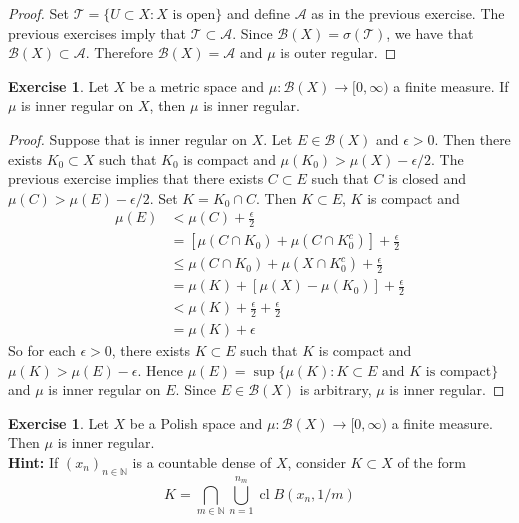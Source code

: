 \documentclass{book}
\theoremstyle{definition}
\newtheorem{ex}[definition]{Exercise}
\newcommand{\ep}{\epsilon}
\newcommand{\sig}{\sigma}
\newcommand{\N}{\mathbb{N}}
\newcommand{\MA}{\mathcal{A}}
\newcommand{\MB}{\mathcal{B}}
\newcommand{\MT}{\mathcal{T}}
\DeclareMathOperator{\cl}{cl}
\DeclareMathOperator*{\0}{\mbf{0}}
\DeclareMathOperator*{\1}{\mbf{1}}
\begin{document}
	\begin{proof}
		Set $\MT = \{U \subset X: X \text{ is open}\}$ and define $\MA$ as in the previous exercise. The previous exercises imply that $\MT \subset \MA$. Since $\MB(X) = \sig(\MT)$, we have that $\MB(X) \subset \MA$. Therefore $\MB(X) = \MA$ and $\mu$ is outer regular.  
	\end{proof}

	\begin{ex}
		Let $X$ be a metric space and $\mu: \MB(X) \rightarrow [0, \infty)$ a finite measure. If $\mu$ is inner regular on $X$, then $\mu$ is inner regular.
	\end{ex}

	\begin{proof}
		Suppose that is inner regular on $X$. Let $E \in \MB(X)$ and $\ep >0$. Then there exists $K_0 \subset X$ such that $K_0$ is compact and $\mu(K_0) > \mu(X) - \ep/2$. The previous exercise implies that there exists $C \subset E$ such that $C$ is closed and $\mu(C) > \mu(E) - \ep/2$. Set $K = K_0 \cap C$. Then $K \subset E$, $K$ is compact and 
		\begin{align*}
			\mu(E)
			& < \mu(C) + \frac{\ep}{2} \\
			& =[ \mu(C \cap K_0) + \mu(C \cap K_0^c)] + \frac{\ep}{2} \\
			& \leq \mu(C \cap K_0) + \mu(X \cap K_0^c) + \frac{\ep}{2} \\
			&= \mu(K) + [\mu(X) - \mu(K_0)] + \frac{\ep}{2} \\
			&< \mu(K) + \frac{\ep}{2} + \frac{\ep}{2} \\
			&= \mu(K) + \ep
		\end{align*}
		So for each $\ep >0$, there exists $K \subset E$ such that $K$ is compact and $\mu(K) > \mu(E) - \ep$. Hence $\mu(E) = \sup\{\mu(K): K \subset E \text{ and  $K$ is compact}\}$ and $\mu$ is inner regular on $E$. Since $E \in \MB(X)$ is arbitrary, $\mu$ is inner regular.
	\end{proof}

	\begin{ex}
		Let $X$ be a Polish space and $\mu: \MB(X) \rightarrow [0, \infty)$ a finite measure. Then $\mu$ is inner regular. \\
		\textbf{Hint:} If $(x_{n})_{n \in \N}$ is a countable dense of $X$, consider $K \subset X$ of the form 
		$$K = \bigcap\limits_{m \in \N} \bigcup\limits_{n = 1}^{n_m} \cl B(x_n, 1/m) $$
	\end{ex}
\end{document}
